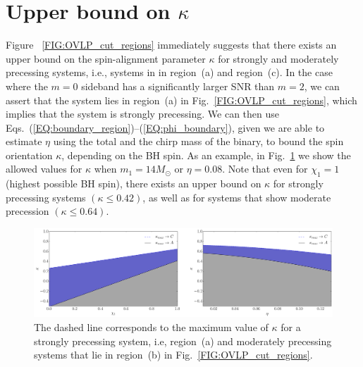 \section{Upper bound on $\kappa$}

Figure ~\ref{FIG:OVLP_cut_regions} immediately suggests that there exists an
upper bound on the spin-alignment parameter $\kappa$ for strongly and
moderately precessing systems, i.e., systems in in region~(a) and region~(c).
In the case where the $m=0$ sideband has a significantly larger SNR than
$m=2$, we can assert that the system lies in region~(a) in
Fig.~\ref{FIG:OVLP_cut_regions}, which implies that the system is strongly
precessing. We can then use
Eqs.~(\ref{EQ:boundary_region})--(\ref{EQ:phi_boundary}), given we are able to
estimate $\eta$ using the total and the chirp mass of the binary, to bound the
spin orientation $\kappa$, depending on the BH spin. As an example, in
Fig.~\ref{FIG:kappa_max_bounds} we show the allowed values for $\kappa$ when
$m_1 = 14 M_{\odot}$ or $\eta=0.08$.  Note that even for $\chi_1=1$ (highest
possible BH spin), there exists an upper bound on $\kappa$ for strongly
precessing systems $(\kappa\leq 0.42)$, as well as for systems that show moderate precession $(\kappa
\leq 0.64)$.

\begin{figure}[!htbp]
\centering
\includegraphics[width=0.6\linewidth]{images/kappa_max_bound.pdf} 
\caption{\small{The dashed line corresponds to the maximum value of $\kappa$ for
    a strongly precessing system, i.e, region~(a) and moderately precessing
    systems that lie in region~(b) in Fig.~\ref{FIG:OVLP_cut_regions}.}}
\label{FIG:kappa_max_bounds}
\end{figure}
